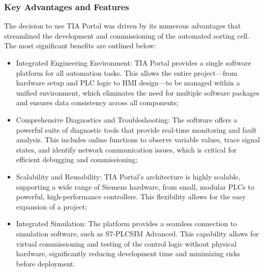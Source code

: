 \subsubsection{Key Advantages and Features}
The decision to use TIA Portal was driven by its numerous advantages that streamlined the development and commissioning of the automated sorting cell. The most significant benefits are outlined below:
\begin{itemize}
\item Integrated Engineering Environment: TIA Portal provides a single software platform for all automation tasks. This allows the entire project—from hardware setup and PLC logic to HMI design—to be managed within a unified environment, which eliminates the need for multiple software packages and ensures data consistency across all components;
\item Comprehensive Diagnostics and Troubleshooting: The software offers a powerful suite of diagnostic tools that provide real-time monitoring and fault analysis. This includes online functions to observe variable values, trace signal states, and identify network communication issues, which is critical for efficient debugging and commissioning;
\item Scalability and Reusability: TIA Portal's architecture is highly scalable, supporting a wide range of Siemens hardware, from small, modular PLCs to powerful, high-performance controllers. This flexibility allows for the easy expansion of a project;
\item Integrated Simulation: The platform provides a seamless connection to simulation software, such as S7-PLCSIM Advanced. This capability allows for virtual commissioning and testing of the control logic without physical hardware, significantly reducing development time and minimizing risks before deployment.
\end{itemize}

